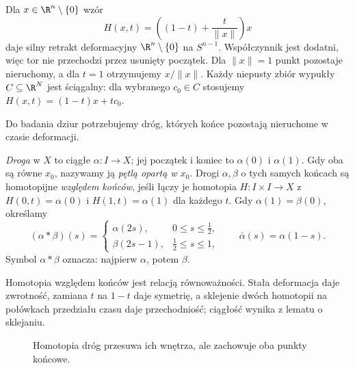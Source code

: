 \begin{przyklad}
\label{prz:retrakcja-pierscien}
Dla $x\in\R^n\setminus\{0\}$ wzór
\[
 H(x,t)=\left((1-t)+\frac{t}{\|x\|}\right)x
\]
daje silny retrakt deformacyjny
$\R^n\setminus\{0\}$ na $S^{n-1}$.
Współczynnik jest dodatni, więc tor
nie przechodzi przez usunięty początek.
Dla $\|x\|=1$ punkt pozostaje nieruchomy,
a dla $t=1$ otrzymujemy $x/\|x\|$.
Każdy niepusty zbiór wypukły $C\subseteq\R^N$ jest ściągalny:
dla wybranego $c_0\in C$ stosujemy
$H(x,t)=(1-t)x+tc_0$.
\end{przyklad}

Do badania dziur potrzebujemy dróg,
których końce pozostają nieruchome w czasie deformacji.

\begin{definicja}
\label{def:droga-petla}
\emph{Droga} w $X$ to ciągłe
$\alpha:I\to X$; jej początek i koniec
to $\alpha(0)$ i $\alpha(1)$.
Gdy oba są równe $x_0$, nazywamy ją
\emph{pętlą opartą w $x_0$}.
Drogi $\alpha,\beta$ o tych samych końcach
są homotopijne \emph{względem końców},
jeśli łączy je homotopia $H:I\times I\to X$
z $H(0,t)=\alpha(0)$ i
$H(1,t)=\alpha(1)$ dla każdego $t$.
Gdy $\alpha(1)=\beta(0)$, określamy
\[
 (\alpha*\beta)(s)=
 \begin{cases}
  \alpha(2s),&0\leq s\leq\tfrac12,\\
  \beta(2s-1),&\tfrac12\leq s\leq1,
 \end{cases}
 \qquad \bar\alpha(s)=\alpha(1-s).
\]
Symbol $\alpha*\beta$ oznacza: najpierw $\alpha$,
potem $\beta$.
\end{definicja}

Homotopia względem końców jest relacją równoważności.
Stała deformacja daje zwrotność, zamiana $t$ na $1-t$ daje
symetrię, a sklejenie dwóch homotopii na połówkach przedziału
czasu daje przechodniość; ciągłość wynika z lematu o sklejaniu.

\begin{figure}[!htbp]
\centering
{}
\caption{Homotopia dróg przesuwa ich wnętrza,
ale zachowuje oba punkty końcowe.}
\label{fig:homotopia-drog}
\end{figure}

